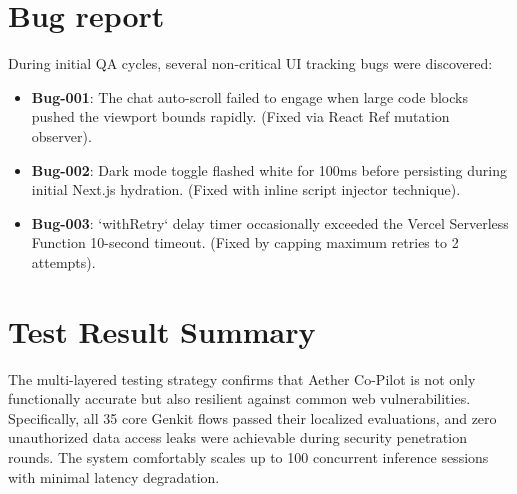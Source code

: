 \section{Bug report}
During initial QA cycles, several non-critical UI tracking bugs were discovered:
\begin{itemize}
    \item \textbf{Bug-001}: The chat auto-scroll failed to engage when large code blocks pushed the viewport bounds rapidly. (Fixed via React Ref mutation observer).
    \item \textbf{Bug-002}: Dark mode toggle flashed white for 100ms before persisting during initial Next.js hydration. (Fixed with inline script injector technique).
    \item \textbf{Bug-003}: `withRetry` delay timer occasionally exceeded the Vercel Serverless Function 10-second timeout. (Fixed by capping maximum retries to 2 attempts).
\end{itemize}

\section{Test Result Summary}
The multi-layered testing strategy confirms that Aether Co-Pilot is not only functionally accurate but also resilient against common web vulnerabilities. Specifically, all 35 core Genkit flows passed their localized evaluations, and zero unauthorized data access leaks were achievable during security penetration rounds. The system comfortably scales up to 100 concurrent inference sessions with minimal latency degradation.

\newpage
